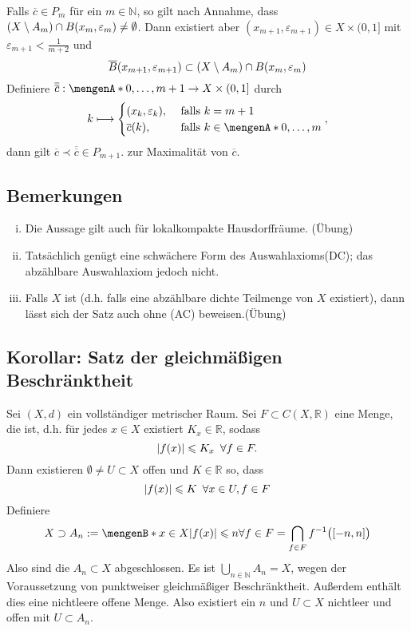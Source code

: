 Falls $\overline{c} \in P_m$ für ein $m \in \mathds{N}$, so gilt nach Annahme, dass $\enbrace*{X \setminus A_m} \cap B(x_m, \varepsilon_m) \not= \emptyset$. Dann 
existiert aber $(x_{m+1},\varepsilon_{m+1}) \in X \times (0,1]$ mit $\varepsilon_{m+1} < \frac{1}{m+2}$ und 
\[
	\overline{B}(x_{m+1}, \varepsilon_{m+1}) \subset  \enbrace*{X \setminus A_m} \cap B(x_m,\varepsilon_m) 
\]
Definiere $\overline{\overline{c}} : \set{0, \ldots , m+1} \to X \times (0,1]$ durch
\[
	k \longmapsto \begin{cases}
		(x_k,\varepsilon_k), &\text{ falls } k=m+1\\
		\overline{c}(k), &\text{ falls } k \in \set{0, \ldots , m} 
	\end{cases},
\]
dann gilt $\overline{c} \prec \overline{\overline{c}} \in P_{m+1}$. \light zur Maximalität von $\overline{c}$. \bewende

\subsection[Bemerkungen zum Satz von Baire]{Bemerkungen} %
\label{sub:111}
\begin{enumerate}[(i)]
	\item Die Aussage gilt auch für lokalkompakte Hausdorffräume. \hfill(Übung)
	\item Tatsächlich genügt eine schwächere Form des Auswahlaxioms(DC); das abzählbare Auswahlaxiom jedoch nicht.
	\item Falls $X$  ist (d.h. falls eine abzählbare dichte Teilmenge von $X$ existiert), dann lässt sich der Satz auch ohne (AC) beweisen.\hfill (Übung)
\end{enumerate}

\subsection{Korollar: Satz der gleichmäßigen Beschränktheit} %
\label{sub:112}
Sei $(X,d)$ ein vollständiger metrischer Raum. Sei $F \subset C(X,\mathds{R})$ eine Menge, die  ist, d.h. für jedes $x \in X$ 
existiert $K_x \in \mathds{R}$, sodass
\[
	\abs*{f(x)} \le K_x \enspace \forall f \in F. 
\] 
Dann existieren $\emptyset \not= U \subset X$ offen und $K \in \mathds{R}$ so, dass 
\[
	\abs*{f(x)} \le K \enspace \forall x \in U, f \in F 
\]
Definiere 
\begin{align*}
	X \supset A_n := \set[x \in X]{\abs*{f(x)} \le n \forall f \in F \rule{0cm}{0.3cm}} = \bigcap_{f \in F} f ^{-1} \enbrace[\big]{[-n,n]} 
\end{align*}
Also sind die $A_n \subset X$ abgeschlossen. Es ist $\bigcup_{n \in \mathds{N}} A_n = X$, wegen der Voraussetzung von punktweiser gleichmäßiger Beschränktheit. Außerdem enthält dies eine nichtleere offene Menge. Also existiert ein $n$ und $U \subset X$ nichtleer und offen mit $U \subset A_n$. \bewende
\newpage

